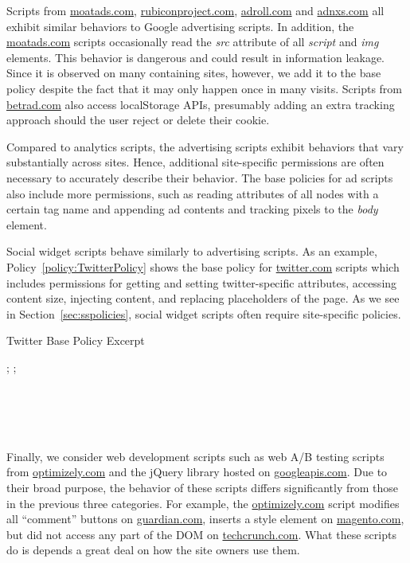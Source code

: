 Scripts from \url{moatads.com}, \url{rubiconproject.com},
\url{adroll.com} and \url{adnxs.com} all exhibit similar behaviors to
Google advertising scripts.  In addition, the \url{moatads.com} scripts
occasionally read the \emph{src} attribute of all \emph{script} and
\emph{img} elements.  This behavior is dangerous and could result in
information leakage. Since it is observed on many containing sites,
however, we add it to the base policy despite the fact that it may only
happen once in many visits.  Scripts from \url{betrad.com} also access
localStorage APIs, presumably adding an extra tracking approach should
the user reject or delete their cookie.

Compared to analytics scripts, the advertising scripts exhibit behaviors
that vary substantially across sites. Hence, additional site-specific
permissions are often necessary to accurately describe their behavior.
The base policies for ad scripts also include more permissions, such as
reading attributes of all nodes with a certain tag name and appending ad
contents and tracking pixels to the \emph{body} element.

 Social widget scripts behave similarly to
advertising scripts.  As an example, Policy~\ref{policy:TwitterPolicy}
shows the base policy for \url{twitter.com} scripts which includes
permissions for getting and setting twitter-specific attributes,
accessing content size, injecting content, and replacing placeholders of
the page.  As we see in Section~\ref{sec:sspolicies}, social widget
scripts often require site-specific policies.

\begin{algorithm}[bth]
  \caption{Twitter Base Policy Excerpt}
  \label{policy:TwitterPolicy}\small\raggedright
{}; ; \\
\\
\hspace{2em}\\
\hspace{2em} \\
\\
\end{algorithm}

\label{sec:bpWebDev} Finally, we consider
web development scripts such as web A/B testing scripts from
\url{optimizely.com} and the jQuery library hosted on
\url{googleapis.com}.  Due to their broad purpose, the behavior of these
scripts differs significantly from those in the previous three
categories.  For example, the \url{optimizely.com} script modifies all
``comment'' buttons on \url{guardian.com}, inserts a style element on
\url{magento.com}, but did not access any part of the DOM on
\url{techcrunch.com}.  What these scripts do is depends a great deal on
how the site owners use them.

